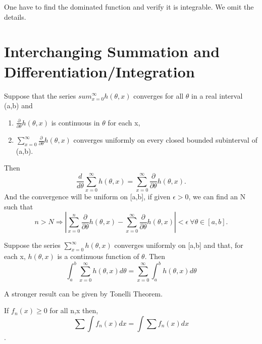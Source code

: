 \documentclass[../Transformation.tex]{subfiles}
\begin{document}
\begin{remark}
One have to find the dominated function and verify it is integrable. We omit the details.
\end{remark}
\section{Interchanging Summation and Differentiation/Integration}
\begin{theorem}Suppose that the series $sum_{x=0}^\infty h(\theta,x)$ converges for all $\theta$ in a real interval (a,b) and
\begin{enumerate}
\item $\frac{\partial}{\partial\theta}h(\theta,x)$ is continuous in $\theta$ for each x,
\item $\sum_{x=0}^{\infty}\frac{\partial}{\partial\theta}h(\theta,x)$ converges uniformly on every closed bounded subinterval of (a,b).
\end{enumerate}
Then $$\frac{d}{d\theta}\sum_{x=0}^{\infty}h(\theta,x)=\sum_{x=0}^{\infty}\frac{\partial}{\partial\theta}h(\theta,x).$$
And the convergence will be uniform on [a,b], if given $\epsilon >0$, we can find an N such that $$n>N\Rightarrow |\sum_{x=0}^n\frac{\partial}{\partial\theta}h(\theta,x)-\sum_{x=0}^{\infty}\frac{\partial}{\partial\theta}h(\theta,x)|<\epsilon\ \forall\theta\in[a,b].$$
\end{theorem}
\begin{theorem}
Suppose the series $\sum_{x=0}^{\infty}h(\theta,x)$ converges uniformly on [a,b] and that, for each x, $h(\theta,x)$ is a continuous function of $\theta$. Then
$$\int_a^b\sum_{x=0}^\infty h(\theta,x)d\theta=\sum_{x=0}^\infty\int_a^b h(\theta,x)d\theta$$
\end{theorem}
A stronger result can be given by Tonelli Theorem.
\begin{theorem}
If $f_n(x)\geq 0$ for all n,x then,
$$\sum\int f_n(x)dx=\int\sum f_n(x)dx$$.
\end{theorem}
\end{document}
